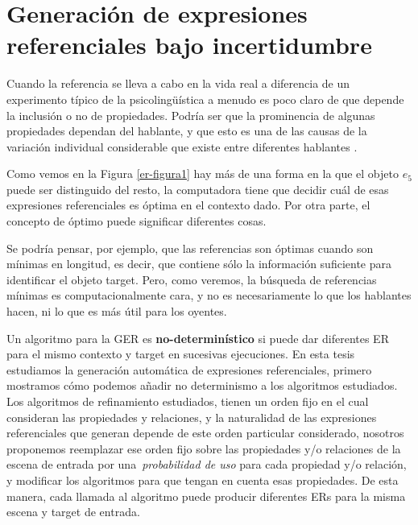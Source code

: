 \section{Generaci\'on de expresiones referenciales bajo incertidumbre}
\label{sec:gre-incertidumbre}


Cuando la referencia se lleva a cabo en la vida real
a diferencia de un experimento t\'ipico de la psicoling\"u\'istica
a menudo es poco claro de que depende la inclusi\'on o no de propiedades. Podr\'ia ser que la prominencia de algunas propiedades dependan del hablante, y que esto es
una de las causas de la variaci\'on individual considerable que existe entre diferentes
hablantes \cite{speaker-dependent}.

Como vemos en la Figura \ref{er-figura1} hay m\'as de una forma en la que el objeto $e_5$ puede ser distinguido del resto, la computadora tiene que decidir cu\'al de esas expresiones referenciales es \'optima en el contexto dado. Por otra parte, el concepto de \'optimo puede significar diferentes cosas.

Se podr\'{i}a pensar, por ejemplo, que las referencias son \'optimas cuando son m\'{i}nimas en longitud, es decir, 
que contiene s\'olo la informaci\'on suficiente para identificar el objeto target. Pero, como veremos, la b\'usqueda de referencias m\'{i}nimas
es computacionalmente cara, y no es necesariamente lo que los hablantes hacen, ni lo que es m\'as \'util para los oyentes.

Un algoritmo para la GER es {\bf no-determin\'istico} si puede dar diferentes ER para el mismo contexto y target en sucesivas ejecuciones.
En esta tesis estudiamos la generaci\'on autom\'atica de expresiones referenciales, 
primero mostramos c\'omo podemos a\~nadir no determinismo a los algoritmos estudiados. Los algoritmos de refinamiento estudiados, tienen un orden fijo en el cual consideran las propiedades y relaciones, y la naturalidad de las expresiones referenciales que generan depende de este orden particular considerado, nosotros proponemos reemplazar ese orden fijo sobre las propiedades y/o relaciones de la escena de entrada por una~\emph{probabilidad de uso} para cada propiedad y/o relaci\'on, y modificar los algoritmos para que tengan en cuenta esas propiedades. De esta manera, cada llamada al algoritmo puede producir diferentes ERs para la misma escena y target de entrada. 

